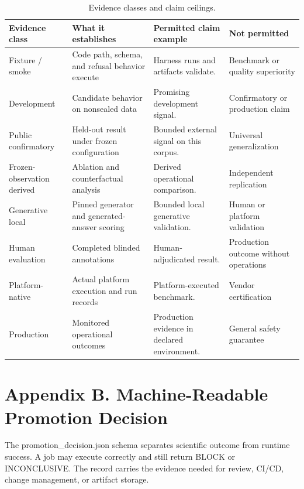 \documentclass[11pt]{article}
\begin{document}
\begin{table}[t]
\centering
\caption{Evidence classes and claim ceilings.}
\small
\begin{tabularx}{\linewidth}{>{\raggedright\arraybackslash}X>{\raggedright\arraybackslash}X>{\raggedright\arraybackslash}X>{\raggedright\arraybackslash}X}
\toprule
\textbf{Evidence class} & \textbf{What it establishes} & \textbf{Permitted claim example} & \textbf{Not permitted} \\
\midrule
Fixture / smoke & Code path, schema, and refusal behavior execute & Harness runs and artifacts validate. & Benchmark or quality superiority \\
Development & Candidate behavior on nonsealed data & Promising development signal. & Confirmatory or production claim \\
Public confirmatory & Held-out result under frozen configuration & Bounded external signal on this corpus. & Universal generalization \\
Frozen-observation derived & Ablation and counterfactual analysis & Derived operational comparison. & Independent replication \\
Generative local & Pinned generator and generated-answer scoring & Bounded local generative validation. & Human or platform validation \\
Human evaluation & Completed blinded annotations & Human-adjudicated result. & Production outcome without operations \\
Platform-native & Actual platform execution and run records & Platform-executed benchmark. & Vendor certification \\
Production & Monitored operational outcomes & Production evidence in declared environment. & General safety guarantee \\
\bottomrule
\end{tabularx}
\end{table}

\section{Appendix B. Machine-Readable Promotion Decision}
The promotion\_decision.json schema separates scientific outcome from runtime success. A job may execute correctly and still return BLOCK or INCONCLUSIVE. The record carries the evidence needed for review, CI/CD, change management, or artifact storage.
\end{document}
